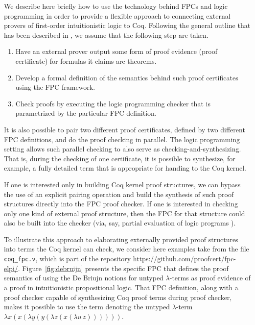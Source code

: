 We describe here briefly how to use the technology behind FPCs and
logic programming in order to provide a flexible approach to
connecting external provers of first-order intuitionistic logic to
Coq.
%
Following the general outline that has been described in
\cite{blanco17cade}, we assume that the following step are taken.
%
\begin{enumerate}
\item Have an external prover output some form of proof evidence
  (proof certificate) for formulas it claims are theorems.

\item Develop a formal definition of the semantics behind such proof
  certificates using the FPC framework.

\item Check proofs by executing the logic programming checker that is
  parametrized by the particular FPC definition.
\end{enumerate}
%
It is also possible to pair two different proof certificates, defined
by two different FPC definitions, and do the proof checking in
parallel.  The logic programming setting allows such parallel checking
to also serve as checking-and-synthesizing.  That is, during the
checking of one certificate, it is possible to synthesize, for
example, a fully detailed term that is appropriate for handing to the
Coq kernel.

If one is interested only in building Coq kernel proof structures, we
can bypass the use of an explicit pairing operation and build the
synthesis of such proof structures directly into the FPC proof
checker.  If one is interested in checking only one kind of external
proof structure, then the FPC for that structure could also be built
into the checker (via, say, partial evaluation of logic programs
\cite{lloyd91jlp}).

To illustrate this approach to elaborating externally provided proof
structures into terms the Coq kernel can check, we consider here
examples take from the file \verb+coq_fpc.v+, which is part of the
repository \url{https://github.com/proofcert/fpc-elpi/}.
Figure~\ref{fig:debruijn} presents the specific FPC that defines the
proof semantics of using the De Briujn notions for untyped
$\lambda$-terms as proof evidence of a proof in intuitionistic
propositional logic.  That FPC definition, along with a proof checker
capable of synthesizing Coq proof terms during proof checker, makes it
possible to use the term denoting the untyped $\lambda$-term
$\lambda x (x (\lambda y (y (\lambda z (x (\lambda u\,z))))))$.

